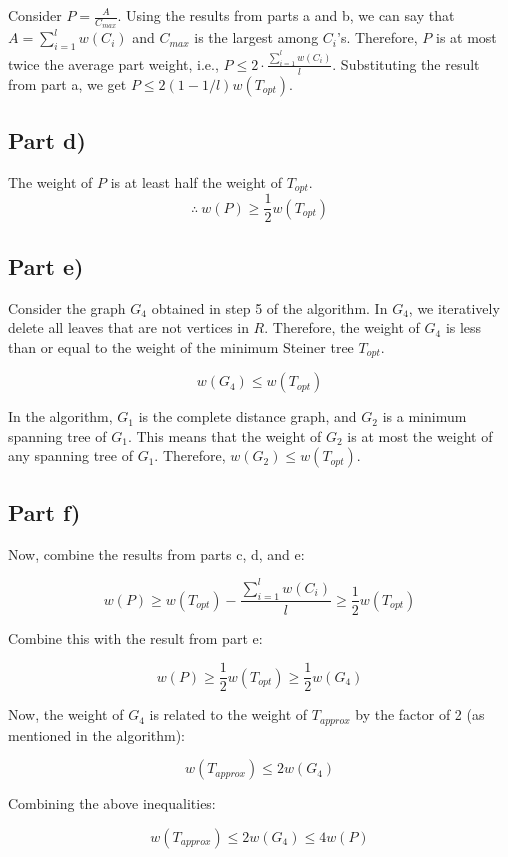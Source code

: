 Consider \(P = \frac{A}{C_{max}}\). Using the results from parts a and b, we can say that \(A = \sum^{l}_{i=1} w(C_i)\) and \(C_{max}\) is the largest among \(C_i\)'s. Therefore, \(P\) is at most twice the average part weight, i.e., \(P \leq 2 \cdot \frac{\sum^{l}_{i=1} w(C_i)}{l}\). Substituting the result from part a, we get \(P \leq 2(1 - 1/l)w(T_{opt})\).

\subsection*{Part d)}

The weight of \(P\) is at least half the weight of \(T_{opt}\).
\[\therefore \ w(P) \geq \frac{1}{2} w(T_{opt})\]

\subsection*{Part e)}

Consider the graph \(G_4\) obtained in step 5 of the algorithm. In \(G_4\), we iteratively delete all leaves that are not vertices in \(R\). Therefore, the weight of \(G_4\) is less than or equal to the weight of the minimum Steiner tree \(T_{opt}\).

\[w(G_4) \leq w(T_{opt})\]

In the algorithm, \(G_1\) is the complete distance graph, and \(G_2\) is a minimum spanning tree of \(G_1\). This means that the weight of \(G_2\) is at most the weight of any spanning tree of \(G_1\). Therefore, \(w(G_2) \leq w(T_{opt})\).

\subsection*{Part f)}

Now, combine the results from parts c, d, and e:

\[w(P) \geq w(T_{opt}) - \frac{ \sum^{l}_{i=1} w(C_i) }{l} \geq \frac{1}{2} w(T_{opt})\]

Combine this with the result from part e:

\[w(P) \geq \frac{1}{2} w(T_{opt}) \geq \frac{1}{2} w(G_4)\]

Now, the weight of \(G_4\) is related to the weight of \(T_{approx}\) by the factor of 2 (as mentioned in the algorithm):

\[w(T_{approx}) \leq 2 w(G_4)\]

Combining the above inequalities:

\[w(T_{approx}) \leq 2 w(G_4) \leq 4 w(P)\]

